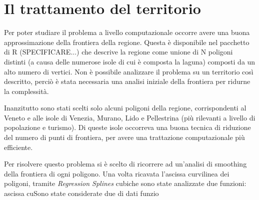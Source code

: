 \documentclass[a4paper,11pt,twoside,openright]{book}							%
\begin{document}
\section{Il trattamento del territorio}

Per poter studiare il problema a livello computazionale occorre avere una buona approssimazione della frontiera della regione. Questa è disponibile nel pacchetto di R (SPECIFICARE...) che descrive la regione come unione di N poligoni distinti (a causa delle numerose isole di cui è composta la laguna) composti da un alto numero di vertici. Non è possibile analizzare il problema su un territorio così descritto, perciò è stata necessaria una analisi iniziale della frontiera per ridurne la complessità.

Inanzitutto sono stati scelti solo alcuni poligoni della regione, corrispondenti al Veneto e alle isole di Venezia, Murano, Lido e Pellestrina (più rilevanti a livello di popolazione e turismo). Di queste isole occorreva una buona tecnica di riduzione del numero di punti di frontiera, per avere una trattazione computazionale più efficiente.

Per risolvere questo problema si è scelto di ricorrere ad un'analisi di smoothing della frontiera di ogni poligono. Una volta ricavata l'ascissa curvilinea dei poligoni, tramite \textit{Regression Splines} cubiche sono state analizzate due funzioni: ascissa cuSono state considerate due di dati funzio
\end{document}
